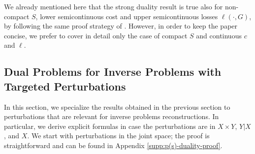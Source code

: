 \documentclass{article}
\theoremstyle{definition}
\theoremstyle{remarksty}
\newtheorem{remark}{Remark}[section]
\newenvironment{remark*}
  {\pushQED{\hfill$\lozenge$}\begin{remark}}
  {\popQED\end{remark}}
\begin{document}
\begin{remark*}\label{rem:strong-duality}
    We already mentioned here that the strong duality result is true also for non-compact $S$, lower semicontinuous cost and upper semicontinuous losses $\ell(\cdot, G)$, by following the same proof strategy of \cite{blanchet_quantifying_2019}. However, in order to keep the paper concise, we prefer to cover in detail only the case of compact $S$ and continuous $c$ and $\ell$. 
\end{remark*}


\subsection{Dual Problems for Inverse Problems with Targeted Perturbations}
In this section, we specialize the results obtained in the previous section to perturbations that are relevant for inverse problems reconstructions. In particular, we derive explicit formulas in case the perturbations are in $X\times Y$, $Y|X$, and $X$. We start with perturbations in the joint space; the proof is straightforward and can be found in Appendix \ref{supp:p(s)-duality-proof}. 
\end{document}
